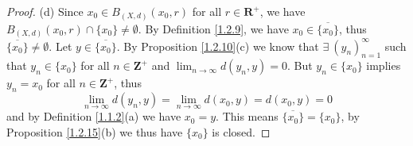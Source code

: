 \begin{proof}{(d)}
    Since \(x_0 \in B_{(X, d)}(x_0, r)\) for all \(r \in \mathbf{R}^+\), we have \(B_{(X, d)}(x_0, r) \cap \{x_0\} \neq \emptyset\).
    By Definition \ref{1.2.9}, we have \(x_0 \in \overline{\{x_0\}}\), thus \(\overline{\{x_0\}} \neq \emptyset\).
    Let \(y \in \overline{\{x_0\}}\).
    By Proposition \ref{1.2.10}(c) we know that \(\exists\ (y_n)_{n = 1}^\infty\) such that \(y_n \in \{x_0\}\) for all \(n \in \mathbf{Z}^+\) and \(\lim_{n \to \infty} d(y_n, y) = 0\).
    But \(y_n \in \{x_0\}\) implies \(y_n = x_0\) for all \(n \in \mathbf{Z}^+\), thus
    \[
        \lim_{n \to \infty} d(y_n, y) = \lim_{n \to \infty} d(x_0, y) = d(x_0, y) = 0
    \]
    and by Definition \ref{1.1.2}(a) we have \(x_0 = y\).
    This means \(\overline{\{x_0\}} = \{x_0\}\), by Proposition \ref{1.2.15}(b) we thus have \(\{x_0\}\) is closed.
\end{proof}

